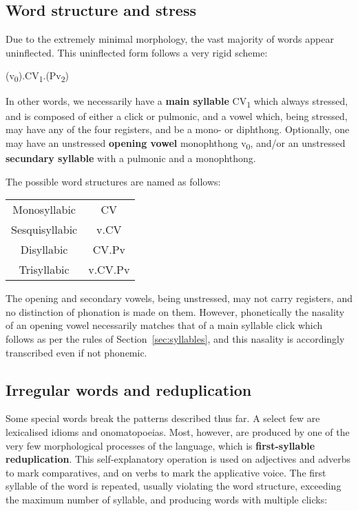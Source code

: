\documentclass[11pt]{book}
\begin{document}
\subsection{Word structure and stress}


Due to the extremely minimal morphology, the vast majority of words appear uninflected. This uninflected form follows a very rigid scheme:

\begin{center}
\large (v\textsubscript{0}).\stress{}CV\textsubscript{1}.(Pv\textsubscript{2})
\end{center}

In other words, we necessarily have a \textbf{main syllable} CV\textsubscript{1} which always stressed, and is composed of either a click or pulmonic, and a vowel which, being stressed, may have any of the four registers, and be a mono- or diphthong. Optionally, one may have an unstressed \textbf{opening vowel} monophthong v\textsubscript{0}, and/or an unstressed \textbf{secundary syllable} with a pulmonic and a monophthong.

The possible word structures are named as follows:

\begin{center}
\begin{tabular}{cc}
	Monosyllabic &  CV \\
	Sesquisyllabic &   v.\stress{}CV \\
	Disyllabic & \stress{}CV.Pv\\
	Trisyllabic & v.\stress{}CV.Pv
\end{tabular}
\end{center}

The opening and secondary vowels, being unstressed, may not carry registers, and no distinction of phonation is made on them. However, phonetically the nasality of an opening vowel necessarily matches that of a main syllable click which follows as per the rules of Section~\ref{sec:syllables}, and this nasality is accordingly transcribed even if not phonemic.

\subsection{Irregular words and reduplication}\label{sec:redup}

Some special words break the patterns described thus far. A select few are lexicalised idioms and onomatopoeias. Most, however, are produced by one of the very few morphological processes of the language, which is \textbf{first-syllable reduplication}. This self-explanatory operation is used on adjectives and adverbs to mark comparatives, and on verbs to mark the applicative voice. The first syllable of the word is repeated, usually violating the word structure, exceeding the maximum number of syllable, and producing words with multiple clicks:
\end{document}
